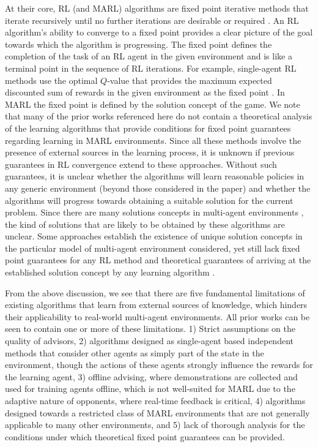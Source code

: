 \documentclass[jair, twoside,11pt,theapa]{article}
\begin{document}
 At their core, RL (and MARL) algorithms are fixed point iterative methods that iterate recursively until no further iterations are desirable or required \citep{littman1996reinforcement}. An RL algorithm's  ability to converge to a fixed point provides a clear picture of the goal towards which the algorithm is progressing. The fixed point defines the completion of the task of an RL agent in the given environment and is like a terminal point in the sequence of RL iterations. For example, single-agent RL methods use the optimal $Q$-value that provides the maximum expected discounted sum of rewards in the given environment as the fixed point \citep{sutton1998introduction}. In MARL the fixed point is defined by the solution concept of the game. We  note that many of the prior works referenced here do not contain a theoretical analysis of the learning algorithms that provide conditions for fixed point guarantees regarding learning in MARL environments. Since all these methods involve the presence of external sources in the learning process, it is unknown if previous guarantees in RL convergence extend to these approaches. Without such guarantees, it is unclear whether the algorithms will learn reasonable policies in any generic environment (beyond those considered in the paper) and whether the algorithms will progress towards obtaining a suitable solution for the current problem. Since there are many solutions concepts in multi-agent environments \citep{shoham2008multiagent}, the kind of solutions that are likely to be obtained by these algorithms are unclear. Some approaches establish the existence of unique solution concepts in the particular model of multi-agent environment considered, yet still lack fixed point guarantees for any RL method and theoretical guarantees of arriving at the established solution concept by any learning algorithm \citep{yu2019multi, song2018multi}.

From the above discussion, we see that there are five fundamental limitations of existing algorithms that learn from external sources of knowledge, which hinders their applicability to real-world multi-agent environments. All prior works can be seen to contain one or more of these limitations. 1) Strict assumptions on the quality of advisors, 2) algorithms designed as single-agent based independent methods that consider other agents as simply part of the state in the environment, though the actions of these agents strongly influence the rewards for the learning agent, 3) offline advising, where demonstrations are collected and used for training agents offline, which is not well-suited for MARL due to the adaptive nature of opponents, where real-time feedback is critical, 4) algorithms designed towards a restricted class of MARL environments that are not generally applicable to many other environments, and 5) lack of thorough analysis for the conditions under which theoretical fixed point guarantees can be provided. 
\end{document}
